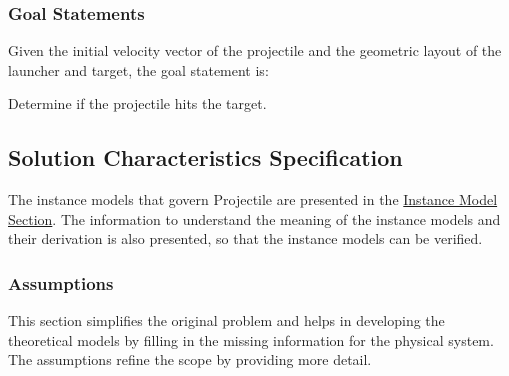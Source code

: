 \documentclass[12pt]{article}
\begin{document}
\subsubsection{Goal Statements}
\label{Sec:GoalStmt}
Given the initial velocity vector of the projectile and the geometric layout of the launcher and target, the goal statement is:

\begin{description}[font=\normalfont]
\item[targetHit:\phantomsection\label{targetHit}]{Determine if the projectile hits the target.}
\end{description}
\subsection{Solution Characteristics Specification}
\label{Sec:SolCharSpec}
The instance models that govern Projectile are presented in the \hyperref[Sec:IMs]{Instance Model Section}. The information to understand the meaning of the instance models and their derivation is also presented, so that the instance models can be verified.

\subsubsection{Assumptions}
\label{Sec:Assumps}
This section simplifies the original problem and helps in developing the theoretical models by filling in the missing information for the physical system. The assumptions refine the scope by providing more detail.
\end{document}
